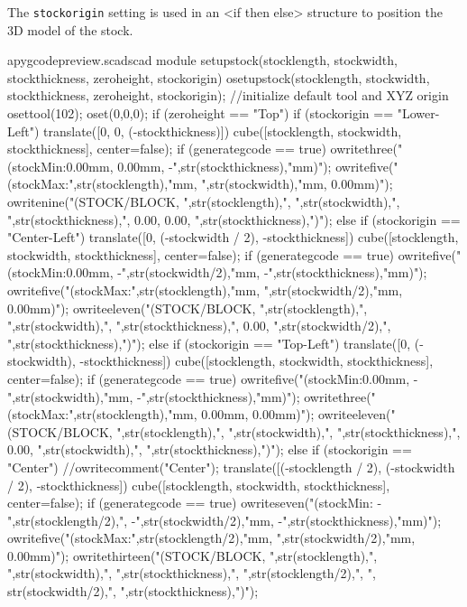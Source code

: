 \documentclass{ltxdoc}
\begin{document}
The \texttt{stockorigin} setting is used in an <if then else> structure to position
the 3D model of the stock. 

\lstset{firstnumber=\thepyscad}
\begin{writecode}{a}{pygcodepreview.scad}{scad}
module setupstock(stocklength, stockwidth, stockthickness, zeroheight, stockorigin) {
  osetupstock(stocklength, stockwidth, stockthickness, zeroheight, stockorigin);
//initialize default tool and XYZ origin
  osettool(102);
  oset(0,0,0);
  if (zeroheight == "Top") {
    if (stockorigin == "Lower-Left") {
    translate([0, 0, (-stockthickness)]){
    cube([stocklength, stockwidth, stockthickness], center=false);
      if (generategcode == true) {
      owritethree("(stockMin:0.00mm, 0.00mm, -",str(stockthickness),"mm)");
      owritefive("(stockMax:",str(stocklength),"mm, ",str(stockwidth),"mm, 0.00mm)");
      owritenine("(STOCK/BLOCK, ",str(stocklength),", ",str(stockwidth),", ",str(stockthickness),", 0.00, 0.00, ",str(stockthickness),")");
    }
  }
}
     else if (stockorigin == "Center-Left") {
    translate([0, (-stockwidth / 2), -stockthickness]){
      cube([stocklength, stockwidth, stockthickness], center=false);
    if (generategcode == true) {
owritefive("(stockMin:0.00mm, -",str(stockwidth/2),"mm, -",str(stockthickness),"mm)");
owritefive("(stockMax:",str(stocklength),"mm, ",str(stockwidth/2),"mm, 0.00mm)");
    owriteeleven("(STOCK/BLOCK, ",str(stocklength),", ",str(stockwidth),", ",str(stockthickness),", 0.00, ",str(stockwidth/2),", ",str(stockthickness),")");
    }
  }
    } else if (stockorigin == "Top-Left") {
    translate([0, (-stockwidth), -stockthickness]){
      cube([stocklength, stockwidth, stockthickness], center=false);
if (generategcode == true) {
owritefive("(stockMin:0.00mm, -",str(stockwidth),"mm, -",str(stockthickness),"mm)");
owritethree("(stockMax:",str(stocklength),"mm, 0.00mm, 0.00mm)");
owriteeleven("(STOCK/BLOCK, ",str(stocklength),", ",str(stockwidth),", ",str(stockthickness),", 0.00, ",str(stockwidth),", ",str(stockthickness),")");
    }
  }
    }
    else if (stockorigin == "Center") {
//owritecomment("Center");
    translate([(-stocklength / 2), (-stockwidth / 2), -stockthickness]){
      cube([stocklength, stockwidth, stockthickness], center=false);
if (generategcode == true) {
owriteseven("(stockMin: -",str(stocklength/2),", -",str(stockwidth/2),"mm, -",str(stockthickness),"mm)");
owritefive("(stockMax:",str(stocklength/2),"mm, ",str(stockwidth/2),"mm, 0.00mm)");
owritethirteen("(STOCK/BLOCK, ",str(stocklength),", ",str(stockwidth),", ",str(stockthickness),", ",str(stocklength/2),", ", str(stockwidth/2),", ",str(stockthickness),")");
}}}}}
\end{writecode}
\end{document}
